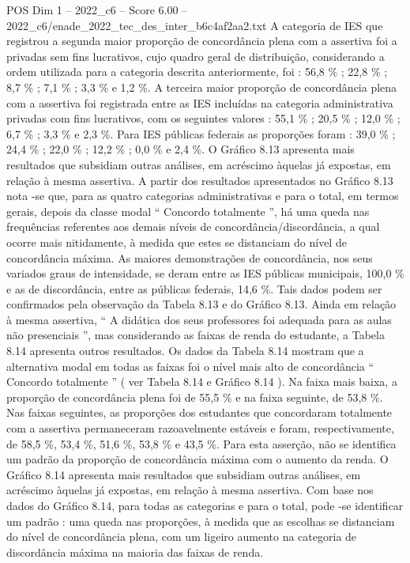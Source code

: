 \begin{textsample}{POS Dim 1 – 2022\_c6 – Score 6.00 – 2022\_c6/enade\_2022\_tec\_des\_inter\_b6c4af2aa2.txt}
A categoria de IES que registrou a segunda maior proporção de concordância plena com a assertiva foi a privadas sem fins lucrativos, cujo quadro geral de distribuição, considerando a ordem utilizada para a categoria descrita anteriormente, foi : 56,8 \% ; 22,8 \% ; 8,7 \% ; 7,1 \% ; 3,3 \% e 1,2 \%.
A terceira maior proporção de concordância plena com a assertiva foi registrada entre as IES incluídas na categoria administrativa privadas com fins lucrativos, com os seguintes valores : 55,1 \% ; 20,5 \% ; 12,0 \% ; 6,7 \% ; 3,3 \% e 2,3 \%.
Para IES públicas federais as proporções foram : 39,0 \% ; 24,4 \% ; 22,0 \% ; 12,2 \% ; 0,0 \% e 2,4 \%.
O Gráfico 8.13 apresenta mais resultados que subsidiam outras análises, em acréscimo àquelas já expostas, em relação à mesma assertiva.
A partir dos resultados apresentados no Gráfico 8.13 nota -se que, para as quatro categorias administrativas e para o total, em termos gerais, depois da classe modal “ Concordo totalmente ”, há uma queda nas frequências referentes aos demais níveis de concordância/discordância, a qual ocorre mais nitidamente, à medida que estes se distanciam do nível de concordância máxima.
As maiores demonstrações de concordância, nos seus variados graus de intensidade, se deram entre as IES públicas municipais, 100,0 \% e as de discordância, entre as públicas federais, 14,6 \%.
Tais dados podem ser confirmados pela observação da Tabela 8.13 e do Gráfico 8.13.
Ainda em relação à mesma assertiva, “ A didática dos seus professores foi adequada para as aulas não presenciais ”, mas considerando as faixas de renda do estudante, a Tabela 8.14 apresenta outros resultados.
Os dados da Tabela 8.14 mostram que a alternativa modal em todas as faixas foi o nível mais alto de concordância “ Concordo totalmente ” ( ver Tabela 8.14 e Gráfico 8.14 ).
Na faixa mais baixa, a proporção de concordância plena foi de 55,5 \% e na faixa seguinte, de 53,8 \%.
Nas faixas seguintes, as proporções dos estudantes que concordaram totalmente com a assertiva permaneceram razoavelmente estáveis e foram, respectivamente, de 58,5 \%, 53,4 \%, 51,6 \%, 53,8 \% e 43,5 \%.
Para esta asserção, não se identifica um padrão da proporção de concordância máxima com o aumento da renda.
O Gráfico 8.14 apresenta mais resultados que subsidiam outras análises, em acréscimo àquelas já expostas, em relação à mesma assertiva.
Com base nos dados do Gráfico 8.14, para todas as categorias e para o total, pode -se identificar um padrão : uma queda nas proporções, à medida que as escolhas se distanciam do nível de concordância plena, com um ligeiro aumento na categoria de discordância máxima na maioria das faixas de renda.

\end{textsample}
